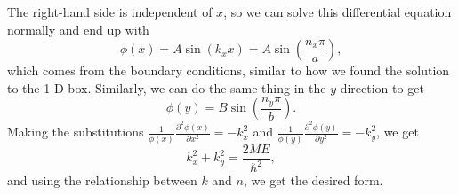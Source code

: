 \documentclass{article}
\begin{document}
\begin{enumerate}[label=(8.\arabic*)]
\begin{equation*}
    \end{equation*}
    The right-hand side is independent of $x$, so we can solve this differential equation normally and end up with
    \begin{equation*}
        \phi(x) = A\sin(k_xx) = A\sin\left(\frac{n_x\pi}{a}\right),
    \end{equation*}
    which comes from the boundary conditions, similar to how we found the solution to the 1-D box. Similarly, we can do the same thing in the $y$ direction to get 
    \begin{equation*}
        \phi(y) = B\sin\left(\frac{n_y\pi}{b}\right).
    \end{equation*}
    Making the substitutions $\frac{1}{\phi(x)}\frac{\partial^2 \phi(x)}{\partial x^2} = -k_x^2$ and $\frac{1}{\phi(y)}\frac{\partial^2 \phi(y)}{\partial y^2} = -k_y^2$, we get
    \begin{equation*}
        k_x^2+k_y^2 = \frac{2ME}{\hbar^2},
    \end{equation*}
    and using the relationship between $k$ and $n$, we get the desired form.


\end{enumerate}
\end{document}
